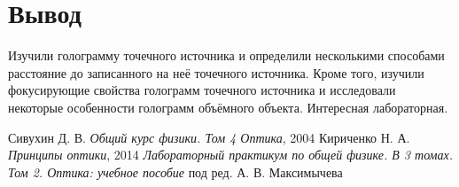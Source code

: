 \documentclass[a4paper]{article}
\begin{document}
\section{Вывод}

Изучили голограмму точечного источника и определили несколькими способами расстояние до записанного на неё точечного источника. Кроме того, изучили фокусирующие свойства голограмм точечного источника и исследовали некоторые особенности голограмм объёмного объекта. Интересная лабораторная.

\newpage

\begin{thebibliography}{9}
	 Сивухин Д. В. \emph{Общий курс физики. Том 4 Оптика}, 2004
	 Кириченко Н. А. \emph{Принципы оптики}, 2014
	 \emph{Лабораторный практикум по общей физике. В 3 томах. Том 2. Оптика: учебное пособие} под ред. А. В. Максимычева
\end{thebibliography}
\end{document}
